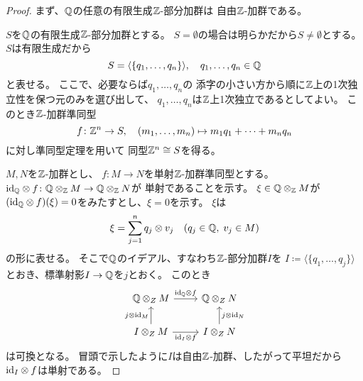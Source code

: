 \documentclass[report]{jlreq}
\begin{document}
\begin{proof}
    まず、$\mathbb{Q}$の任意の有限生成$\mathbb{Z}$-部分加群は
    自由$\mathbb{Z}$-加群である。
    \begin{innerproof}
        $S$を$\mathbb{Q}$の有限生成$\mathbb{Z}$-部分加群とする。
        $S = \emptyset$の場合は明らかだから$S \neq \emptyset$とする。
        $S$は有限生成だから
        \begin{equation}
            S = \langle \{ q_1, \dots, q_n \} \rangle,
            \quad
            q_1, \dots, q_n \in \mathbb{Q}
        \end{equation}
        と表せる。
        ここで、必要ならば$q_1, \dots, q_n$の
        添字の小さい方から順に$\mathbb{Z}$上の1次独立性を保つ元のみを選び出して、
        $q_1, \dots, q_n$は$\mathbb{Z}$上1次独立であるとしてよい。
        このとき$\mathbb{Z}$-加群準同型
        \begin{equation}
            f \colon \mathbb{Z}^n \to S,
            \quad
            (m_1, \dots, m_n) \mapsto m_1 q_1 + \cdots + m_n q_n
        \end{equation}
        に対し準同型定理を用いて
        同型$\mathbb{Z}^n \cong S$を得る。
    \end{innerproof}
    $M, N$を$\mathbb{Z}$-加群とし、
    $f \colon M \to N$を単射$\mathbb{Z}$-加群準同型とする。
    $\mathrm{id}_{\mathbb{Q}} \otimes f \colon \mathbb{Q} \otimes_{\mathbb{Z}} M \to \mathbb{Q} \otimes_{\mathbb{Z}} N$が
    単射であることを示す。
    $\xi \in \mathbb{Q} \otimes_{\mathbb{Z}} M$が
    $(\mathrm{id}_{\mathbb{Q}} \otimes f)(\xi) = 0$をみたすとし、$\xi = 0$を示す。
    $\xi$は
    \begin{equation}
        \xi = \sum_{j = 1}^n q_j \otimes v_j
            \quad
            (q_j \in \mathbb{Q}, \; v_j \in M)
    \end{equation}
    の形に表せる。
    そこで$\mathbb{Q}$のイデアル、すなわち$\mathbb{Z}$-部分加群$I$を
    $I \coloneqq \langle \{ q_1, \dots, q_j \} \rangle$
    とおき、標準射影$I \to \mathbb{Q}$を$j$とおく。
    このとき
    \begin{equation}
        \begin{tikzcd}
            \Q \otimes_Z M
                \ar{r}{\id_\Q \otimes f}
                & \Q \otimes_Z N \\
            I \otimes_Z M
                \ar{u}{j \otimes \id_M}
                \ar{r}[swap]{\id_I \otimes f}
                & I \otimes_Z N
                \ar{u}[swap]{j \otimes \id_N}
        \end{tikzcd}
    \end{equation}
    は可換となる。
    冒頭で示したように$I$は自由$\mathbb{Z}$-加群、したがって平坦だから
    $\mathrm{id}_I \otimes f$は単射である。
    \TODO{}
\end{proof}
\end{document}

